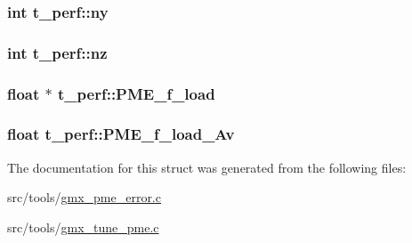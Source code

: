 \hypertarget{structt__perf_a83802e48fb61d6cdc67d7ccaabed25d5}{
\subsubsection[{ny}]{\setlength{\rightskip}{0pt plus 5cm}int {\bf t\-\_\-perf\-::ny}}}\label{structt__perf_a83802e48fb61d6cdc67d7ccaabed25d5}
\hypertarget{structt__perf_a20bfcf805e60bc6d45e74df1f3cb1670}{
\subsubsection[{nz}]{\setlength{\rightskip}{0pt plus 5cm}int {\bf t\-\_\-perf\-::nz}}}\label{structt__perf_a20bfcf805e60bc6d45e74df1f3cb1670}
\hypertarget{structt__perf_a277a06d0201621ab6f3eaf413cdca05a}{
\subsubsection[{\-P\-M\-E\-\_\-f\-\_\-load}]{\setlength{\rightskip}{0pt plus 5cm}float $\ast$ {\bf t\-\_\-perf\-::\-P\-M\-E\-\_\-f\-\_\-load}}}\label{structt__perf_a277a06d0201621ab6f3eaf413cdca05a}
\hypertarget{structt__perf_acc9fb3db5c5468fb2c0c861fdf9560dd}{
\subsubsection[{\-P\-M\-E\-\_\-f\-\_\-load\-\_\-\-Av}]{\setlength{\rightskip}{0pt plus 5cm}float {\bf t\-\_\-perf\-::\-P\-M\-E\-\_\-f\-\_\-load\-\_\-\-Av}}}\label{structt__perf_acc9fb3db5c5468fb2c0c861fdf9560dd}


\-The documentation for this struct was generated from the following files\-:\begin{DoxyCompactItemize}
\item 
src/tools/\hyperlink{gmx__pme__error_8c}{gmx\-\_\-pme\-\_\-error.\-c}\item 
src/tools/\hyperlink{gmx__tune__pme_8c}{gmx\-\_\-tune\-\_\-pme.\-c}\end{DoxyCompactItemize}
